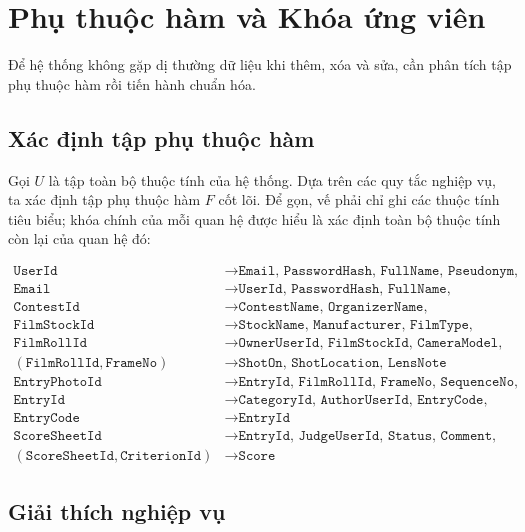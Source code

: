 \section{Phụ thuộc hàm và Khóa ứng viên}

Để hệ thống không gặp dị thường dữ liệu khi thêm, xóa và sửa, cần phân tích tập phụ thuộc hàm rồi tiến hành chuẩn hóa.

\subsection*{Xác định tập phụ thuộc hàm}

Gọi $U$ là tập toàn bộ thuộc tính của hệ thống. Dựa trên các quy tắc nghiệp vụ, ta xác định tập phụ thuộc hàm $F$ cốt lõi. Để gọn, vế phải chỉ ghi các thuộc tính tiêu biểu; khóa chính của mỗi quan hệ được hiểu là xác định toàn bộ thuộc tính còn lại của quan hệ đó:

{\footnotesize\begin{align}
\texttt{UserId} &\rightarrow \texttt{Email, PasswordHash, FullName, Pseudonym, DateOfBirth} \\
\texttt{Email} &\rightarrow \texttt{UserId, PasswordHash, FullName, Pseudonym} \label{eq:fd-email} \\
\texttt{ContestId} &\rightarrow \texttt{ContestName, OrganizerName, SubmissionDeadline} \\
\texttt{FilmStockId} &\rightarrow \texttt{StockName, Manufacturer, FilmType, BoxSpeed} \\
\texttt{FilmRollId} &\rightarrow \texttt{OwnerUserId, FilmStockId, CameraModel, ExposureIndex} \label{eq:fd-roll} \\
(\texttt{FilmRollId}, \texttt{FrameNo}) &\rightarrow \texttt{ShotOn, ShotLocation, LensNote} \label{eq:fd-frame} \\
\texttt{EntryPhotoId} &\rightarrow \texttt{EntryId, FilmRollId, FrameNo, SequenceNo, ScanMethod} \\
\texttt{EntryId} &\rightarrow \texttt{CategoryId, AuthorUserId, EntryCode, Status} \\
\texttt{EntryCode} &\rightarrow \texttt{EntryId} \label{eq:fd-entrycode} \\
\texttt{ScoreSheetId} &\rightarrow \texttt{EntryId, JudgeUserId, Status, Comment, LockedAt} \\
(\texttt{ScoreSheetId}, \texttt{CriterionId}) &\rightarrow \texttt{Score}
\end{align}}

\subsection*{Giải thích nghiệp vụ}

